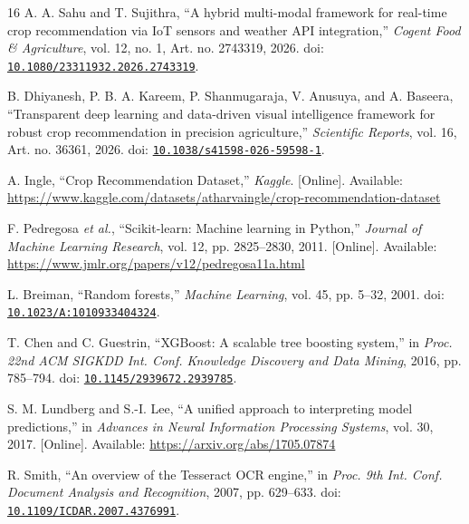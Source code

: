 \documentclass[conference]{IEEEtran}
\begin{document}
\begin{thebibliography}{16}
A. A. Sahu and T. Sujithra, ``A hybrid multi-modal framework for real-time crop recommendation via IoT sensors and weather API integration,'' \emph{Cogent Food \& Agriculture}, vol. 12, no. 1, Art. no. 2743319, 2026. doi: \href{https://doi.org/10.1080/23311932.2026.2743319}{\nolinkurl{10.1080/23311932.2026.2743319}}.

B. Dhiyanesh, P. B. A. Kareem, P. Shanmugaraja, V. Anusuya, and A. Baseera, ``Transparent deep learning and data-driven visual intelligence framework for robust crop recommendation in precision agriculture,'' \emph{Scientific Reports}, vol. 16, Art. no. 36361, 2026. doi: \href{https://doi.org/10.1038/s41598-026-59598-1}{\nolinkurl{10.1038/s41598-026-59598-1}}.

A. Ingle, ``Crop Recommendation Dataset,'' \emph{Kaggle}. [Online]. Available: \url{https://www.kaggle.com/datasets/atharvaingle/crop-recommendation-dataset}

F. Pedregosa \emph{et al.}, ``Scikit-learn: Machine learning in Python,'' \emph{Journal of Machine Learning Research}, vol. 12, pp. 2825--2830, 2011. [Online]. Available: \url{https://www.jmlr.org/papers/v12/pedregosa11a.html}

L. Breiman, ``Random forests,'' \emph{Machine Learning}, vol. 45, pp. 5--32, 2001. doi: \href{https://doi.org/10.1023/A:1010933404324}{\nolinkurl{10.1023/A:1010933404324}}.

T. Chen and C. Guestrin, ``XGBoost: A scalable tree boosting system,'' in \emph{Proc. 22nd ACM SIGKDD Int. Conf. Knowledge Discovery and Data Mining}, 2016, pp. 785--794. doi: \href{https://doi.org/10.1145/2939672.2939785}{\nolinkurl{10.1145/2939672.2939785}}.

S. M. Lundberg and S.-I. Lee, ``A unified approach to interpreting model predictions,'' in \emph{Advances in Neural Information Processing Systems}, vol. 30, 2017. [Online]. Available: \url{https://arxiv.org/abs/1705.07874}

R. Smith, ``An overview of the Tesseract OCR engine,'' in \emph{Proc. 9th Int. Conf. Document Analysis and Recognition}, 2007, pp. 629--633. doi: \href{https://doi.org/10.1109/ICDAR.2007.4376991}{\nolinkurl{10.1109/ICDAR.2007.4376991}}.

\end{thebibliography}
\end{document}
